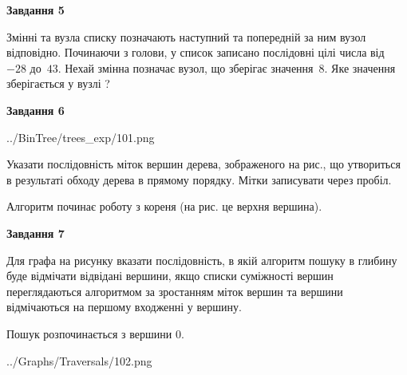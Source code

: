 \documentclass[12pt, ukrainian]{article}
\begin{document}
{\begin {large}
{\begin {center}\textbf{Завдання 5}\end {center}}\par
Змінні  та  вузла списку позначають наступний та попередній за ним вузол відповідно. Починаючи з голови, у список записано послідовні цілі числа від~$-28$ до~$43$. Нехай змінна  позначає вузол, що зберігає значення~$8$.
Яке значення зберігається у вузлі  ?\par
\newpage

{\begin {center}\textbf{Завдання 6}\end {center}}\par

\begin{center}
	{../BinTree/trees_exp/101.png}
\end{center}
Указати послідовність міток вершин дерева, зображеного на рис., що утвориться в результаті обходу дерева в прямому порядку. Мітки записувати через пробіл.\par Алгоритм починає роботу з кореня (на рис. це верхня вершина).\par
\newpage

{\begin {center}\textbf{Завдання 7}\end {center}}\par
Для графа на рисунку вказати послідовність, в якій алгоритм пошуку в глибину буде відмічати відвідані вершини, якщо списки суміжності вершин переглядаються алгоритмом за зростанням міток вершин та вершини відмічаються на першому вход\-женні у вершину.\par
Пошук розпочинається з вершини 0.\par

\begin{center}
	{../Graphs/Traversals/102.png}
\end{center}\par
\newpage


\end{large}}
\end{document}
